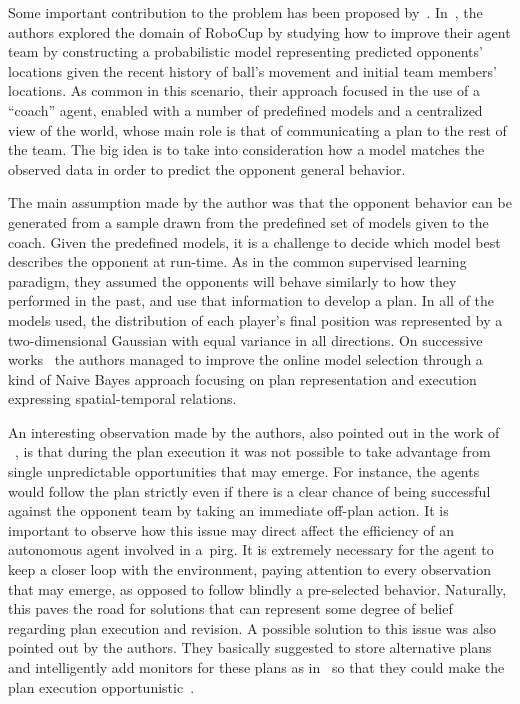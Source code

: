 Some important contribution to the problem has been proposed by~\citep{fix_behavior_2000,riley_recognizing_2002,riley_coaching_2001,riley_planning_2002}. In~\cite{riley_recognizing_2002}, the authors explored the domain of RoboCup by studying how to improve their agent team by constructing a probabilistic model representing predicted opponents' locations given the recent history of ball's movement and initial team members' locations. As common in this scenario, their approach focused in the use of a ``coach'' agent, enabled with a number of predefined models and a centralized view of the world, whose main role is that of communicating a plan to the rest of the team. The big idea is to take into consideration how a model matches the observed data in order to predict the opponent general behavior. 

The main assumption made by the author was that the opponent behavior can be generated from a sample drawn from the predefined set of models given to the coach. Given the predefined models, it is a challenge to decide which model best describes the opponent at run-time. As in the common supervised learning paradigm, they assumed the opponents will behave similarly to how they performed in the past, and use that information to develop a plan. In all of the models used, the distribution of each player's final position was represented by a two-dimensional Gaussian with equal variance in all directions. On successive works~\citep{riley_coaching_2001,riley_planning_2002} the authors managed to improve the online model selection through a kind of Naive Bayes approach focusing on plan representation and execution expressing spatial-temporal relations. 

An interesting observation made by the authors, also pointed out in the work of ~\cite{rofer_overview_2012}, is that during the plan execution it was not possible to take advantage from single unpredictable opportunities that may emerge. For instance, the agents would follow the plan strictly even if there is a clear chance of being successful against the opponent team by taking an immediate off-plan action. It is important to observe how this issue may direct affect the efficiency of an autonomous agent involved in a~\gls{pirg}. It is extremely necessary for the agent to keep a closer loop with the environment, paying attention to every observation that may emerge, as opposed to follow blindly a pre-selected behavior. Naturally, this paves the road for solutions that can represent some degree of belief regarding plan execution and revision. A possible solution to this issue was also pointed out by the authors. They basically suggested to store alternative plans and intelligently add monitors for these plans as in~\cite{veloso_rationale-based_1998} so that they could make the plan execution opportunistic~\citep{riley_coaching_2001,riley_planning_2002,rofer_overview_2012}.

